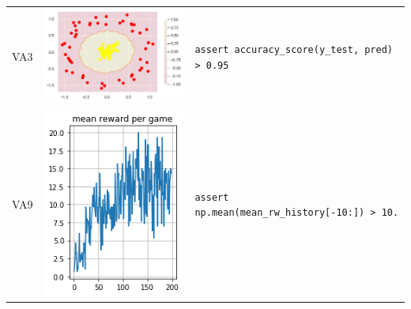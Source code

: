 \begin{longtable}{@{} m{} m{} m{} @{}}
  VA3 &
  \includegraphics[width=\linewidth]{va3.png} &
  \lstinline[]$assert accuracy_score(y_test, pred) > 0.95$\\

  VA9 &
  \includegraphics[width=\linewidth]{va9.png} &
  \lstinline[]$assert np.mean(mean_rw_history[-10:]) > 10.$\\


\end{longtable}
